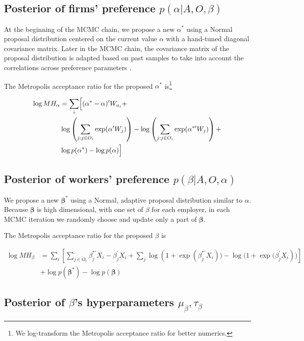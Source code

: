 \subsection{Posterior of firms' preference $p(\alpha|A, O, \beta)$}

At the beginning of the MCMC chain, we propose a new $\alpha^*$ using a Normal
proposal distribution centered on the current value $\alpha$ with a hand-tuned
diagonal covariance matrix. Later in the MCMC chain, the covariance matrix of
the proposal distribution is adapted based on past samples to take into account the
correlations across preference parameters \citep{Haario2001}.

The Metropolis acceptance ratio for the proposed $\alpha^*$ is\footnote{We
  log-transform the Metropolis acceptance ratio for better numerics.}

\begin{align}
  \log MH_\alpha &= \sum_i \Bigl[ (\alpha^* - \alpha)' W_{a_i} + \nonumber \\
                 & \log\left(\sum\limits_{j:j \in O_i} \exp(\alpha' W_j)\right) -
                   \log\left(\sum\limits_{j:j \in O_i} \exp(\alpha^{*\prime} W_j)\right) + \nonumber\\
                 & \log p(\alpha^*) - \log p(\alpha) \Bigr]
\end{align}

\subsection{Posterior of workers' preference $p(\beta|A, O, \alpha)$}

We propose a new $\bm{\beta}^*$ using a Normal, adaptive proposal distribution
similar to $\alpha$. Because $\bm{\beta}$ is high dimensional, with one set of
$\beta$ for each employer, in each MCMC iteration we randomly choose and update
only a part of $\bm{\beta}$.

The Metropolis acceptance ratio for the proposed $\beta$ is

\begin{align}
  \log MH_\beta &= \sum_i \left[ \sum_{j \in O_i} \beta_j^{*\prime}X_i - \beta_j^{\prime}X_i + \sum_{j} \log(1 + {\exp({\beta_j^{*\prime}X_i})) - \log(1 +  \exp(\beta_j^{\prime}X_i})) \right] \nonumber \\
                & + \log p(\bm{\beta}^*) - \log p(\bm{\beta})
\end{align}


\subsection{Posterior of $\beta$'s hyperparameters $\mu_{\beta}, \tau_{\beta}$}


